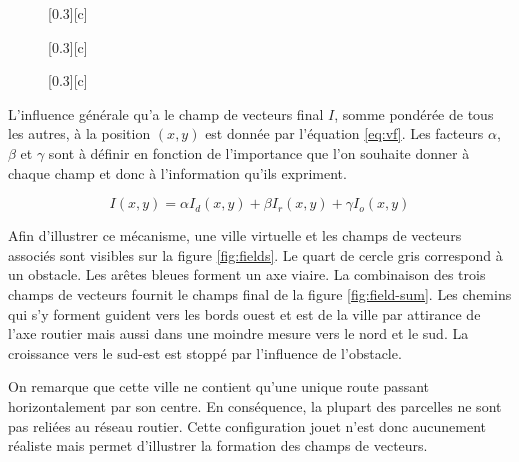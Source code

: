 \documentclass[10pt]{article}
\begin{document}
\begin{figure}[H]
  \centering
  \subcaptionbox{}[0.3\linewidth][c]{
    
  }
  \subcaptionbox{}[0.3\linewidth][c]{
    
  }
  \subcaptionbox{}[0.3\linewidth][c]{
    
  }
  \caption{}
  \label{fig:bilinear-interp}
\end{figure}

L'influence générale qu'a le champ de vecteurs final $I$, somme
pondérée de tous les autres, à la position $(x,y)$ est donnée par
l'équation \ref{eq:vf}. Les facteurs $\alpha$, $\beta$ et $\gamma$
sont à définir en fonction de l'importance que l'on souhaite donner à
chaque champ et donc à l'information qu'ils expriment.

\begin{equation}
  I(x,y) = \alpha I_d(x,y) + \beta I_r(x,y) + \gamma I_o(x,y)
  \label{eq:vf}
\end{equation}

Afin d'illustrer ce mécanisme, une ville virtuelle et les champs de
vecteurs associés sont visibles sur la figure \ref{fig:fields}. Le
quart de cercle gris correspond à un obstacle. Les arêtes bleues
forment un axe viaire. La combinaison des trois champs de vecteurs
fournit le champs final de la figure \ref{fig:field-sum}. Les chemins
qui s'y forment guident vers les bords ouest et est de la ville par
attirance de l'axe routier mais aussi dans une moindre mesure vers le
nord et le sud. La croissance vers le sud-est est stoppé par
l'influence de l'obstacle.

On remarque que cette ville ne contient qu'une unique route passant
horizontalement par son centre. En conséquence, la plupart des
parcelles ne sont pas reliées au réseau routier. Cette configuration
jouet n'est donc aucunement réaliste mais permet d'illustrer la
formation des champs de vecteurs.
\end{document}
